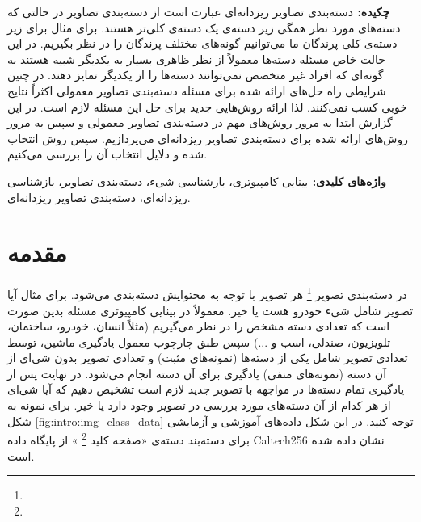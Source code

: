 \documentclass[11pt]{article}
\begin{document}



{\bf {چکيده: }}
دسته‌بندی تصاویر ریزدانه‌ای عبارت است از دسته‌بندی تصاویر در حالتی که دسته‌های مورد نظر همگی زیر دسته‌ی یک دسته‌ی کلی‌تر هستند. برای مثال برای زیر دسته‌ی کلی پرندگان ما می‌توانیم گونه‌های مختلف پرندگان را در نظر بگیریم. در این حالت خاص مسئله دسته‌ها معمولاً از نظر ظاهری بسیار به یکدیگر شبیه هستند به گونه‌ای که افراد غیر متخصص نمی‌توانند دسته‌ها را از یکدیگر تمایز دهند. در چنین شرایطی راه حل‌های ارائه شده برای مسئله دسته‌بندی تصاویر معمولی اکثراً نتایج خوبی کسب نمی‌کنند. لذا ارائه روش‌هایی جدید برای حل این مسئله لازم است.
در این گزارش ابتدا به مرور روش‌های مهم در دسته‌بندی تصاویر معمولی و سپس به مرور روش‌های ارائه شده برای دسته‌بندی تصاویر ریزدانه‌ای می‌پردازیم. سپس روش انتخاب شده و دلایل انتخاب آن را بررسی می‌کنیم.


{\bf  { واژه‌های کلیدی: }}
بینایی کامپیوتری، بازشناسی شیء، دسته‌بندی تصاویر، بازشناسی ریزدانه‌ای، دسته‌بندی تصاویر ریزدانه‌ای.

\setlength{\parindent}{0.25in} %

\section{مقدمه}\label{intro}
در دسته‌بندی تصویر 
\footnote{}
هر تصویر با توجه به محتوایش دسته‌بندی می‌شود. برای مثال آیا تصویر شامل شی‌ء خودرو هست یا خیر. معمولاً در بینایی کامپیوتری مسئله بدین صورت است که تعدادی دسته مشخص را در نظر می‌گیریم (مثلاً انسان، خودرو، ساختمان، تلویزیون، صندلی، اسب و ...) سپس طبق چارچوب معمول یادگیری ماشین، توسط تعدادی تصویر شامل یکی از دسته‌ها (نمونه‌های مثبت) و تعدادی تصویر بدون شی‌ای از آن دسته (نمونه‌های منفی) یادگیری برای آن دسته انجام می‌شود. در نهایت پس از یادگیری تمام دسته‌ها در مواجهه با تصویر جدید لازم است تشخیص دهیم که آیا شی‌ای از هر کدام از آن دسته‌های مورد بررسی در تصویر وجود دارد یا خیر.
برای نمونه به شکل
\ref{fig:intro:img_class_data}
توجه کنید. در این شکل داده‌های آموزشی و آزمایشی برای دسته‌بند دسته‌ی «صفحه کلید
\footnote{}
» از پایگاه داده
Caltech256 \cite{caltech256}
 نشان داده شده است.
\end{document}

